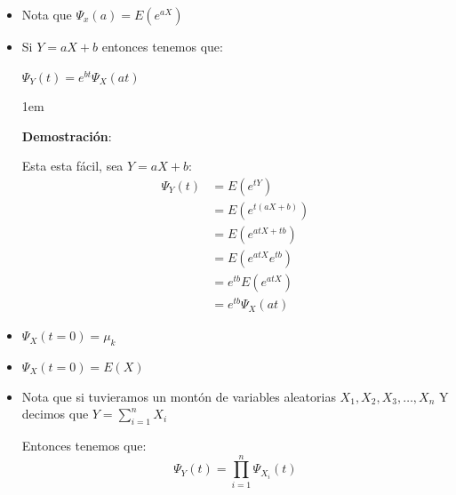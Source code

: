 \documentclass[12pt, fleqn]{report}                             %
\newenvironment{SmallIndentation}[1][0.75em]                    %
        {\begin{adjustwidth}{#1}{}\begin{footnotesize}}             %
        {\end{footnotesize}\end{adjustwidth}}                       %
\theoremstyle{break}                                            %
\begin{document}
                \begin{itemize}

                    \item
                        Nota que $\Psi_x(a) = E(e^{aX})$

                    \item
                        Si $Y = aX + b$ entonces tenemos que:

                        $\Psi_Y(t) = e^{bt} \Psi_X(at)$

                        \begin{SmallIndentation}[1em]
                            \textbf{Demostración}:
                            
                            Esta esta fácil, sea $Y = aX + b$:
                            \begin{align*}
                                \Psi_Y(t) 
                                    &= E(e^{tY})                    \\
                                    &= E(e^{t(aX + b)})             \\
                                    &= E(e^{at X + tb})             \\
                                    &= E(e^{at X} e^{tb})           \\
                                    &= e^{tb} E(e^{at X})           \\
                                    &= e^{tb} \Psi_X(at)
                            \end{align*}
                        
                        \end{SmallIndentation}
                            

                    \item
                        $\Psi_X (t = 0) = \mu_k$

                    \item
                        $\Psi_X (t = 0) = E(X)$

                    \item
                        Nota que si tuvieramos un montón de variables aleatorias
                        $X_1, X_2, X_3, \dots, X_n$
                        Y decimos que $\displaystyle Y = \sum_{i = 1}^n X_i$

                        Entonces tenemos que:
                        \begin{equation*}
                            \Psi_Y(t) = \prod_{i = 1}^n \Psi_{X_i}(t)
                        \end{equation*}


\end{itemize}
\end{document}
